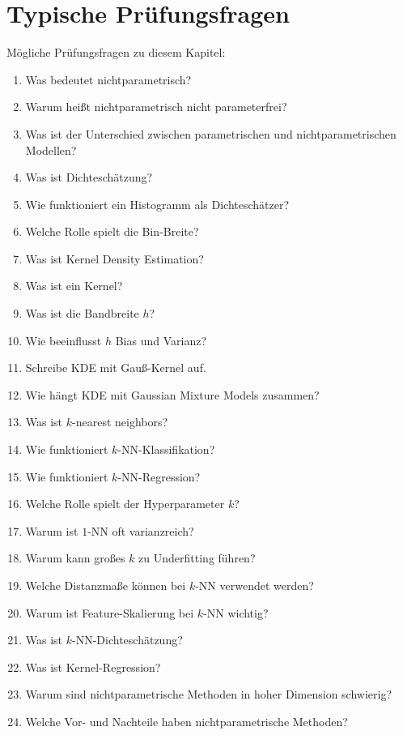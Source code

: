 \section{Typische Prüfungsfragen}

\begin{examtipbox}
Mögliche Prüfungsfragen zu diesem Kapitel:

\begin{enumerate}
    \item Was bedeutet nichtparametrisch?
    \item Warum heißt nichtparametrisch nicht parameterfrei?
    \item Was ist der Unterschied zwischen parametrischen und nichtparametrischen Modellen?
    \item Was ist Dichteschätzung?
    \item Wie funktioniert ein Histogramm als Dichteschätzer?
    \item Welche Rolle spielt die Bin-Breite?
    \item Was ist Kernel Density Estimation?
    \item Was ist ein Kernel?
    \item Was ist die Bandbreite \(h\)?
    \item Wie beeinflusst \(h\) Bias und Varianz?
    \item Schreibe KDE mit Gauß-Kernel auf.
    \item Wie hängt KDE mit Gaussian Mixture Models zusammen?
    \item Was ist \(k\)-nearest neighbors?
    \item Wie funktioniert \(k\)-NN-Klassifikation?
    \item Wie funktioniert \(k\)-NN-Regression?
    \item Welche Rolle spielt der Hyperparameter \(k\)?
    \item Warum ist \(1\)-NN oft varianzreich?
    \item Warum kann großes \(k\) zu Underfitting führen?
    \item Welche Distanzmaße können bei \(k\)-NN verwendet werden?
    \item Warum ist Feature-Skalierung bei \(k\)-NN wichtig?
    \item Was ist \(k\)-NN-Dichteschätzung?
    \item Was ist Kernel-Regression?
    \item Warum sind nichtparametrische Methoden in hoher Dimension schwierig?
    \item Welche Vor- und Nachteile haben nichtparametrische Methoden?
\end{enumerate}
\end{examtipbox}